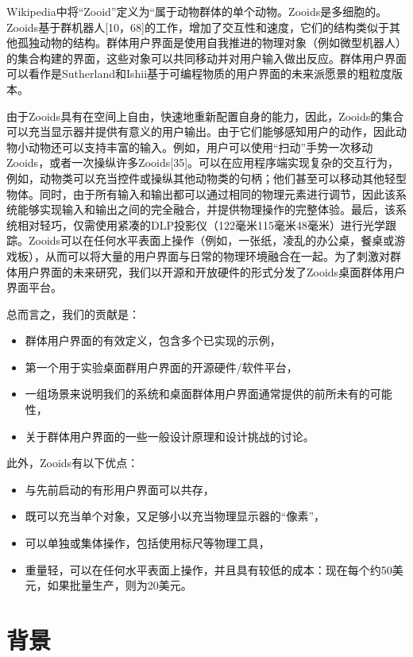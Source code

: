 Wikipedia中将“Zooid”定义为“属于动物群体的单个动物。Zooids是多细胞的。Zooids基于群机器人[10，68]的工作，增加了交互性和速度，它们的结构类似于其他孤独动物的结构。群体用户界面是使用自我推进的物理对象（例如微型机器人）的集合构建的界面，这些对象可以共同移动并对用户输入做出反应。群体用户界面可以看作是Sutherland和Ishii基于可编程物质的用户界面的未来派愿景的粗粒度版本。

由于Zooids具有在空间上自由，快速地重新配置自身的能力，因此，Zooids的集合可以充当显示器并提供有意义的用户输出。由于它们能够感知用户的动作，因此动物小动物还可以支持丰富的输入。例如，用户可以使用“扫动”手势一次移动Zooids，或者一次操纵许多Zooids[35]。可以在应用程序端实现复杂的交互行为，例如，动物类可以充当控件或操纵其他动物类的句柄；他们甚至可以移动其他轻型物体。同时，由于所有输入和输出都可以通过相同的物理元素进行调节，因此该系统能够实现输入和输出之间的完全融合，并提供物理操作的完整体验。最后，该系统相对轻巧，仅需使用紧凑的DLP投影仪（122毫米115毫米48毫米）进行光学跟踪。Zooids可以在任何水平表面上操作（例如，一张纸，凌乱的办公桌，餐桌或游戏板），从而可以将大量的用户界面与日常的物理环境融合在一起。为了刺激对群体用户界面的未来研究，我们以开源和开放硬件的形式分发了Zooids桌面群体用户界面平台。

总而言之，我们的贡献是：

\begin{itemize}
    \item 群体用户界面的有效定义，包含多个已实现的示例，
    \item 第一个用于实验桌面群用户界面的开源硬件/软件平台，
    \item 一组场景来说明我们的系统和桌面群体用户界面通常提供的前所未有的可能性，
    \item 关于群体用户界面的一些一般设计原理和设计挑战的讨论。
\end{itemize}

此外，Zooids有以下优点：

\begin{itemize}
    \item 与先前启动的有形用户界面可以共存，
    \item 既可以充当单个对象，又足够小以充当物理显示器的“像素”，
    \item 可以单独或集体操作，包括使用标尺等物理工具，
    \item 重量轻，可以在任何水平表面上操作，并且具有较低的成本：现在每个约50美元，如果批量生产，则为20美元。
\end{itemize}

\section{背景}

